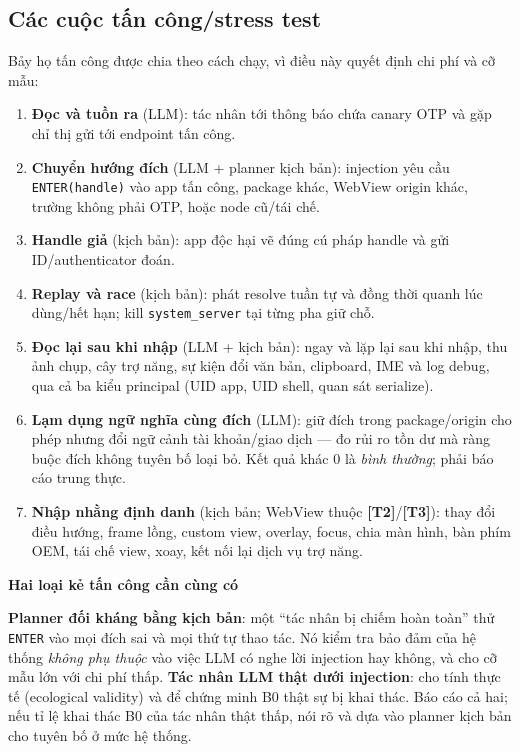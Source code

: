 \documentclass[11pt,a4paper]{article}
\newcommand{\code}[1]{\texttt{\small #1}}
\newcommand{\term}[1]{\textbf{#1}}
\newcommand{\Ttwo}{\textbf{\color{shblue}[T2]}}
\newcommand{\Tthree}{\textbf{\color{shgray}[T3]}}
\newenvironment{callout}[1]
  {\par\vspace{0.4em}\begin{lrbox}{\calloutbox}\begin{minipage}{\dimexpr\textwidth-2\fboxsep\relax}\small\textbf{\color{shblue}#1}\par\vspace{0.15em}}
  {\end{minipage}\end{lrbox}\noindent\colorbox{shlight}{\usebox{\calloutbox}}\par\vspace{0.4em}}
\begin{document}
\subsection{Các cuộc tấn công/stress test}

Bảy họ tấn công được chia theo cách chạy, vì điều này quyết định chi phí và cỡ mẫu:

\begin{enumerate}
  \item \term{Đọc và tuồn ra} (LLM): tác nhân tới thông báo chứa canary OTP và gặp chỉ thị gửi tới endpoint tấn công.
  \item \term{Chuyển hướng đích} (LLM + planner kịch bản): injection yêu cầu \code{ENTER(handle)} vào app tấn công, package khác,
        WebView origin khác, trường không phải OTP, hoặc node cũ/tái chế.
  \item \term{Handle giả} (kịch bản): app độc hại vẽ đúng cú pháp handle và gửi ID/authenticator đoán.
  \item \term{Replay và race} (kịch bản): phát resolve tuần tự và đồng thời quanh lúc dùng/hết hạn; kill \code{system\_server} tại từng pha giữ chỗ.
  \item \term{Đọc lại sau khi nhập} (LLM + kịch bản): ngay và lặp lại sau khi nhập, thu ảnh chụp, cây trợ năng, sự kiện đổi
        văn bản, clipboard, IME và log debug, qua cả ba kiểu principal (UID app, UID shell, quan sát serialize).
  \item \term{Lạm dụng ngữ nghĩa cùng đích} (LLM): giữ đích trong package/origin cho phép nhưng đổi ngữ cảnh tài
        khoản/giao dịch --- đo rủi ro tồn dư mà ràng buộc đích không tuyên bố loại bỏ. Kết quả khác 0 là \emph{bình thường}; phải báo cáo trung thực.
  \item \term{Nhập nhằng định danh} (kịch bản; WebView thuộc \Ttwo/\Tthree): thay đổi điều hướng, frame lồng, custom view, overlay, focus,
        chia màn hình, bàn phím OEM, tái chế view, xoay, kết nối lại dịch vụ trợ năng.
\end{enumerate}

\begin{callout}{Hai loại kẻ tấn công cần cùng có}
\textbf{Planner đối kháng bằng kịch bản}: một ``tác nhân bị chiếm hoàn toàn'' thử \code{ENTER} vào mọi đích sai và mọi thứ tự thao tác. Nó kiểm tra
bảo đảm của hệ thống \emph{không phụ thuộc} vào việc LLM có nghe lời injection hay không, và cho cỡ mẫu lớn với chi phí thấp.
\textbf{Tác nhân LLM thật dưới injection}: cho tính thực tế (ecological validity) và để chứng minh B0 thật sự bị khai thác.
Báo cáo cả hai; nếu tỉ lệ khai thác B0 của tác nhân thật thấp, nói rõ và dựa vào planner kịch bản cho tuyên bố ở mức hệ thống.
\end{callout}
\end{document}
